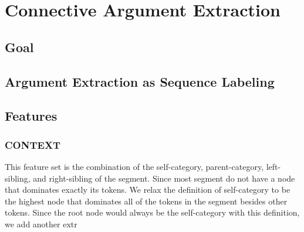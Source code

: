 \section{Connective Argument Extraction}

\subsection{Goal}

\subsection{Argument Extraction as Sequence Labeling}

\subsection{Features}

\subsubsection{CONTEXT}

This feature set is the combination of the self-category, parent-category, left-sibling,
and right-sibling of the segment. Since most segment do not have a node that dominates
exactly its tokens. We relax the definition of self-category to be the highest node that
dominates all of the tokens in the segment besides other tokens. Since the root node would
always be the self-category with this definition, we add another extr
